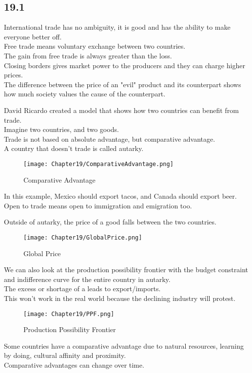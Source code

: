 \subsection*{19.1}
International trade has no ambiguity, it is good and has the ability to make everyone better off.\\
Free trade means voluntary exchange between two countries.\\
The gain from free trade is always greater than the loss.\\
Closing borders gives market power to the producers and they can charge higher prices.\\
The difference between the price of an "evil" product and its counterpart shows how much society values the cause of the counterpart.
\par
David Ricardo created a model that shows how two countries can benefit from trade.\\
Imagine two countries, and two goods.\\
Trade is not based on absolute advantage, but comparative advantage.\\
A country that doesn't trade is called autarky.
\begin{figure}[H]
    \centering
    \texttt{[image: Chapter19/ComparativeAdvantage.png]}
    \caption{Comparative Advantage}
    \label{fig:comparativeadvantage}
\end{figure}
In this example, Mexico should export tacos, and Canada should export beer.\\
Open to trade means open to immigration and emigration too.
\par
Outside of autarky, the price of a good falls between the two countries.
\begin{figure}[H]
    \centering
    \texttt{[image: Chapter19/GlobalPrice.png]}
    \caption{Global Price}
    \label{fig:globalprice}
\end{figure}
\par
We can also look at the production possibility frontier with the budget constraint and indifference curve for the entire country in autarky.\\
The excess or shortage of a leads to export/imports.\\
This won't work in the real world because the declining industry will protest.
\begin{figure}
    \centering
    \texttt{[image: Chapter19/PPF.png]}
    \caption{Production Possibility Frontier}
    \label{fig:ppf}
\end{figure}
\par
Some countries have a comparative advantage due to natural resources, learning by doing, cultural affinity and proximity.\\
Comparative advantages can change over time.